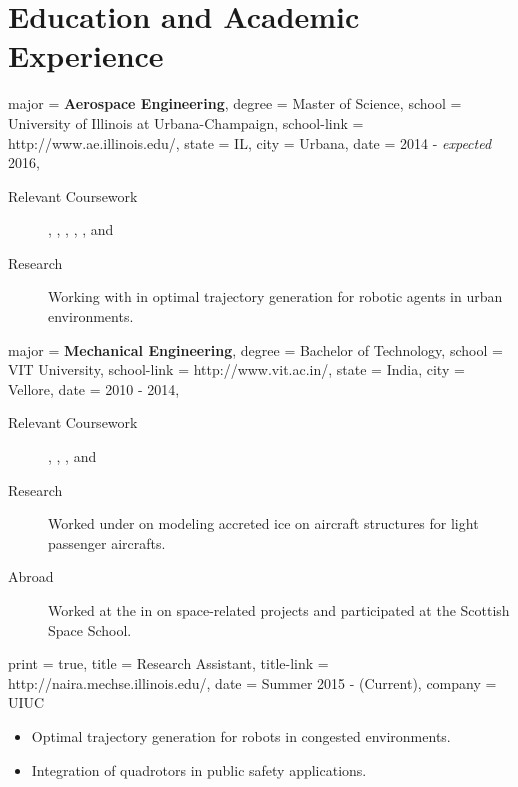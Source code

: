 \documentclass{simplecv}
\begin{document}
\section{Education and Academic Experience}
\begin{education}
  {
      major = \textbf{Aerospace Engineering},
      degree = Master of Science,
      school = University of Illinois at Urbana-Champaign,
      school-link = http://www.ae.illinois.edu/,
      state = IL,
      city = Urbana,
      date = 2014 - \textit{expected} 2016,
  }

\begin{description}
    \item[Relevant Coursework]
        ,
    ,
    ,
    ,
    ,
    and 
\item[Research] Working with  in optimal trajectory generation for robotic agents in urban environments.
  
\end{description}
\end{education}
\begin{education}
  {
      major = \textbf{Mechanical Engineering},
      degree = Bachelor of Technology,
      school = VIT University,
      school-link = http://www.vit.ac.in/,
      state = India,
      city = Vellore,
      date = 2010 - 2014,
  }

\begin{description}
    \item[Relevant Coursework]
    ,
    ,
    ,
    and
\item[Research] Worked under  on modeling accreted ice on aircraft structures for light passenger aircrafts.
\item[Abroad] 
    Worked at the \href{http://www.stratch.ac.uk/engineering}{} in  on space-related projects and participated at the Scottish Space School. 
\end{description}
\end{education}

\begin{position}
  {
      print   = true,
      title   = Research Assistant,
      title-link = http://naira.mechse.illinois.edu/,
      date    = Summer 2015 - (Current),
      company = UIUC
  }

  \begin{itemize}
      \item Optimal trajectory generation for robots in congested environments.
      \item Integration of quadrotors in public safety applications.
  \end{itemize}
\end{position}
\end{document}
